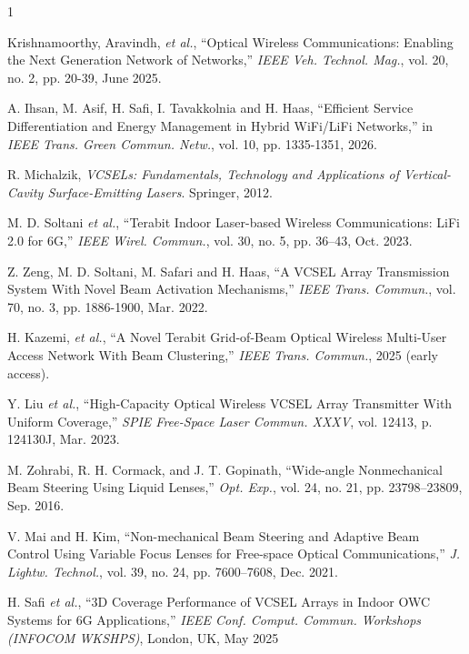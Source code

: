 \documentclass[twocolumn,twoside]{IEEEtran}
\theoremstyle{break}
\begin{document}
\begin{thebibliography}{1}
		

		
		Krishnamoorthy, Aravindh, \textit{et al.}, ``Optical Wireless Communications: Enabling the Next Generation Network of Networks,'' \textit{IEEE Veh. Technol. Mag.}, vol. 20, no. 2, pp. 20-39, June 2025.
		
		
		A. Ihsan, M. Asif, H. Safi, I. Tavakkolnia and H. Haas, ``Efficient Service Differentiation and Energy Management in Hybrid WiFi/LiFi Networks,'' in \textit{IEEE Trans. Green Commun. Netw.}, vol. 10, pp. 1335-1351, 2026.
		
		
		R. Michalzik, \textit{VCSELs: Fundamentals, Technology and Applications of
			Vertical-Cavity Surface-Emitting Lasers}. Springer, 2012.
			
		M. D. Soltani \textit{et al.}, ``Terabit Indoor Laser-based Wireless Communications: LiFi 2.0 for 6G,'' \textit{IEEE Wirel. Commun.}, vol. 30, no. 5,
		pp. 36–43, Oct. 2023.	
		
		Z. Zeng, M. D. Soltani, M. Safari and H. Haas, ``A VCSEL Array Transmission System With Novel Beam Activation Mechanisms,'' \textit{IEEE Trans. Commun.}, vol. 70, no. 3, pp. 1886-1900, Mar. 2022.
		
		H. Kazemi, \textit{et al.}, ``A Novel
		Terabit Grid-of-Beam Optical Wireless Multi-User Access Network
		With Beam Clustering,'' \textit{IEEE Trans. Commun.}, 2025 (early access).
		
		Y. Liu \textit{et al.}, ``High-Capacity Optical Wireless VCSEL Array
		Transmitter With Uniform Coverage,'' \textit{SPIE Free-Space Laser Commun. XXXV}, vol. 12413, p. 124130J, Mar. 2023.
		
		M. Zohrabi, R. H. Cormack, and J. T. Gopinath, ``Wide-angle Nonmechanical Beam Steering Using Liquid Lenses,'' \textit{Opt. Exp.}, vol. 24, no. 21,
		pp. 23798–23809, Sep. 2016.
		
		V. Mai and H. Kim, ``Non-mechanical Beam Steering and Adaptive Beam Control Using Variable Focus Lenses for Free-space Optical Communications,'' \textit{J. Lightw. Technol.}, vol. 39, no. 24, pp. 7600–7608,
		Dec. 2021.
		
		H. Safi \textit{et al.}, ``3D Coverage Performance of VCSEL Arrays in Indoor
		OWC Systems for 6G Applications,'' \textit{IEEE Conf. Comput. Commun.
		Workshops (INFOCOM WKSHPS)}, London, UK, May 2025
		

\end{thebibliography}
\end{document}
